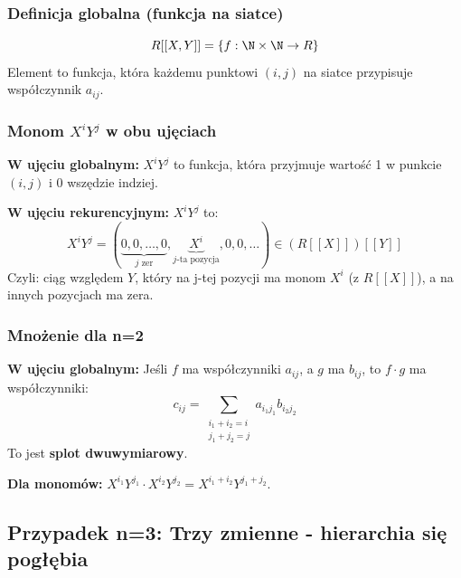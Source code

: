 \subsubsection{Definicja globalna (funkcja na siatce)}

\[
R[[X,Y]] = \left\{ f: \N \times \N \to R \right\}
\]
Element to funkcja, która każdemu punktowi $(i,j)$ na siatce przypisuje współczynnik $a_{ij}$.

\begin{center}
\end{center}

\subsubsection{Monom $X^iY^j$ w obu ujęciach}

\textbf{W ujęciu globalnym:} $X^iY^j$ to funkcja, która przyjmuje wartość 1 w punkcie $(i,j)$ i 0 wszędzie indziej.

\textbf{W ujęciu rekurencyjnym:} $X^iY^j$ to:
\[
X^iY^j = (\underbrace{0, 0, \dots, 0}_{j\text{ zer}}, \underbrace{X^i}_{j\text{-ta pozycja}}, 0, 0, \dots) \in (R[[X]])[[Y]]
\]
Czyli: ciąg względem $Y$, który na j-tej pozycji ma monom $X^i$ (z $R[[X]]$), a na innych pozycjach ma zera.

\subsubsection{Mnożenie dla n=2}

\textbf{W ujęciu globalnym:} Jeśli $f$ ma współczynniki $a_{ij}$, a $g$ ma $b_{ij}$, to $f \cdot g$ ma współczynniki:
\[
c_{ij} = \sum_{\substack{i_1+i_2=i \\ j_1+j_2=j}} a_{i_1j_1} b_{i_2j_2}
\]
To jest \textbf{splot dwuwymiarowy}.

\textbf{Dla monomów:} $X^{i_1}Y^{j_1} \cdot X^{i_2}Y^{j_2} = X^{i_1+i_2}Y^{j_1+j_2}$.

\subsection{Przypadek n=3: Trzy zmienne - hierarchia się pogłębia}

